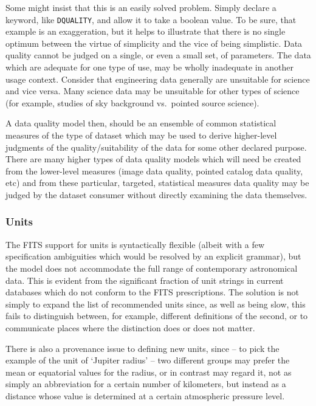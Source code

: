 \documentclass[final,authoryear,5p,times,twocolumn]{elsarticle}
\begin{document}
{{Some might insist that this is an easily solved problem. Simply
declare a keyword, like \texttt{DQUALITY}, and allow it to take a boolean
value. To be sure, that example is an exaggeration, but it helps to
illustrate that there is no single optimum between the virtue of
simplicity and the vice of being simplistic.
Data quality cannot be judged on a single, or even a
small set, of parameters. The
data which are adequate for one type of use, may be wholly inadequate
in another usage context. Consider that engineering data generally are
unsuitable for science and vice versa. Many science data may be
unsuitable for other types of science (for example, studies of sky
background vs.\ pointed source science).


A data quality model then, should be an ensemble of common statistical
measures of the type of dataset which may be used to derive
higher-level judgments of the quality/suitability of the data for
some other declared purpose. There are many higher types of data
quality models which will need be created from the lower-level
measures (image data quality, pointed catalog data quality, etc) and
from these particular, targeted, statistical measures data quality may
be judged by the dataset consumer without directly examining the data
themselves.


\subsubsection{Units}


The FITS support for units is syntactically flexible (albeit with
a few specification ambiguities which would be resolved by an explicit
grammar), but the model does not accommodate the full range of
contemporary astronomical data.  This is evident from the significant
fraction of unit strings in current databases which do not conform to
the FITS prescriptions.  The solution is not simply to expand the list
of recommended units since, as well as being slow, this fails to
distinguish between, for example, different definitions of the second,
or to communicate places where the distinction does or does not
matter.

There is also a provenance issue to defining new units, since -- to
pick the example of the unit of `Jupiter radius' -- two different
groups may prefer the mean or equatorial values for the radius, or in contrast
may regard it, not as simply an abbreviation for a certain number of
kilometers, but instead as a distance whose value is determined at a
certain atmospheric pressure level.

}}
\end{document}
